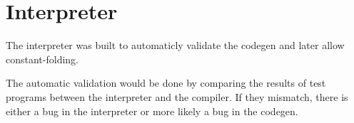\section{Interpreter}
The interpreter was built to automaticly validate the codegen and later allow constant-folding.

The automatic validation would be done by comparing the results of test programs between the interpreter and the compiler.
If they mismatch, there is either a bug in the interpreter or more likely a bug in the codegen.

